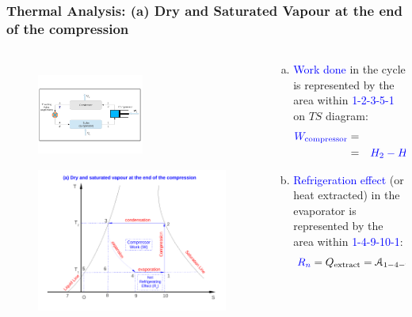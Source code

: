 \documentclass[10pt,compress]{beamer}
\begin{document}
\begin{frame}
 \frametitle{Thermal Analysis: (a) Dry and Saturated Vapour at the end of the compression}
 \begin{columns}
  \begin{column}[c]{0.35\linewidth}
   \begin{figure}%
     \vbox{
      \includegraphics[width=3.5cm,height=3.5cm,clip]{./Pics/Overview_Refrig12}
      \vspace{-.6cm}
      \includegraphics[width=4.cm,height=4.cm,clip]{./Pics/Overview_Refrig14}}
   \end{figure}  
  \end{column}  
  \begin{column}[c]{0.65\linewidth}
   \begin{enumerate}[(a)]
    \item <1-> \textcolor{blue}{Work done} in the cycle is represented by the area within \textcolor{blue}{1-2-3-5-1} on $TS$ diagram:
      \begin{eqnarray}
       \textcolor{blue}{W_{\text{compressor}}} &=& \mathcal{A}_{1-2-3-5-1} \nonumber \\
         &=& \textcolor{blue}{H_{2}-H_{1}}\;\;\text{ with } H_{2} = H_{g}\left(T_{2}\right) \nonumber
      \end{eqnarray}
    \item <2-> \textcolor{blue}{Refrigeration effect} (or heat extracted) in the evaporator is represented by the area within \textcolor{blue}{1-4-9-10-1}:
      \begin{displaymath}
       \textcolor{blue}{R_{n}} = Q_{\text{extract}} = \mathcal{A}_{1-4-9-10-1} = \textcolor{blue}{H_{1}-H_{4}}
      \end{displaymath}
   \end{enumerate}
  \end{column}  
 \end{columns}
\end{frame}
\end{document}

